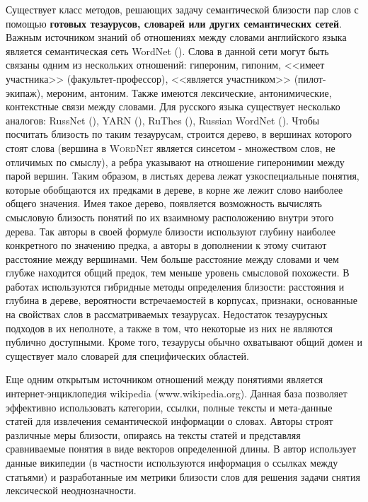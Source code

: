 Существует класс методов, решающих задачу семантической близости пар слов с помощью \textbf{готовых тезаурусов, словарей или других семантических сетей}. Важным источником знаний об отношениях между словами английского языка является семантическая сеть WordNet (\cite{wordnet}). Слова в данной сети могут быть связаны одним из нескольких отношений: гипероним, гипоним, <<имеет участника>> (факультет-профессор), <<является участником>> (пилот-экипаж), мероним, антоним. Также имеются лексические, антонимические, контекстные связи между словами. Для русского языка существует несколько аналогов: RussNet (\cite{russnet}), YARN (\cite{yarn, yarn_2}), RuThes (\cite{ruthes}), Russian WordNet (\cite{russian_wordnet}).  Чтобы посчитать близость по таким тезаурусам, строится дерево, в вершинах которого стоят слова (вершина в \textsc{WordNet} является синсетом - множеством слов, не отличимых по смыслу), а ребра указывают на отношение гиперонимии между парой вершин. Таким образом, в листьях дерева лежат узкоспециальные понятия, которые обобщаются их предками в дереве, в корне же лежит слово наиболее общего значения. Имея такое дерево, появляется возможность вычислять смысловую близость понятий по их взаимному расположению внутри этого дерева. Так авторы \cite{wordnet_sim_0} в своей формуле близости используют глубину наиболее конкретного по значению предка, а авторы  \cite{wordnet_sim_1} в дополнении к этому считают расстояние между вершинами. Чем больше расстояние между словами и чем глубже находится общий предок, тем меньше уровень смысловой похожести. В работах \cite{wordnet_hybrid_1,wordnet_hybrid_2} используются гибридные методы определения близости: расстояния и глубина в дереве, вероятности встречаемостей в корпусах, признаки, основанные на свойствах слов в рассматриваемых тезаурусах. Недостаток тезаурусных подходов в их неполноте, а также в том, что некоторые из них не являются публично доступными. Кроме того, тезаурусы обычно охватывают общий домен и существует мало словарей для специфических областей.

Еще одним открытым источником отношений между понятиями является интернет-энциклопедия wikipedia (www.wikipedia.org). Данная база позволяет эффективно использовать категории, ссылки, полные тексты и мета-данные статей для извлечения семантической информации о словах. Авторы \cite{wiki} строят различные меры близости, опираясь на тексты статей и представляя сравниваемые понятия в виде векторов определенной длины. В \cite{wiki_2} автор использует данные википедии (в частности используются информация о ссылках между статьями) и разработанные им метрики близости слов для решения задачи снятия лексической неоднозначности. 


